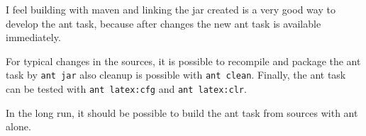 I feel building with maven and linking the jar created
is a very good way to develop the ant task,
because after changes the new ant task is available immediately.

For typical changes in the sources,
it is possible to recompile and package the ant task
by \texttt{ant jar} also cleanup is possible with \texttt{ant clean}.
Finally, the ant task can be tested with \texttt{ant latex:cfg}
and \texttt{ant latex:clr}. 

In the long run, it should be possible to build the ant task from sources
with ant alone.


